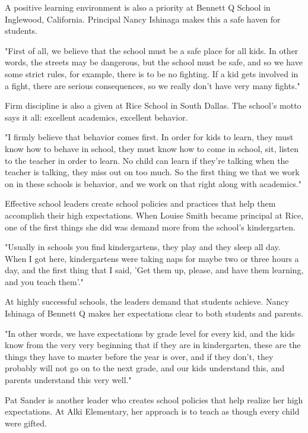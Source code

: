 A positive learning environment is also a priority at Bennett Q School in Inglewood, California. Principal Nancy Ishinaga makes this a safe haven for students.

"First of all, we believe that the school must be a safe place for all kids. In other words, the streets may be dangerous, but the school must be safe, and so we have some strict rules, for example, there is to be no fighting. If a kid gets involved in a fight, there are serious consequences, so we really don't have very many fights."

Firm discipline is also a given at Rice School in South Dallas. The school's motto says it all: excellent academics, excellent behavior.

"I firmly believe that behavior comes first. In order for kids to learn, they must know how to behave in school, they must know how to come in school, sit, listen to the teacher in order to learn. No child can learn if they're talking when the teacher is talking, they miss out on too much. So the first thing we that we work on in these schools is behavior, and we work on that right along with academics."

Effective school leaders create school policies and practices that help them accomplish their high expectations. When Louise Smith became principal at Rice, one of the first things she did was demand more from the school's kindergarten.

"Usually in schools you find kindergartens, they play and they sleep all day. When I got here, kindergartens were taking naps for maybe two or three hours a day, and the first thing that I said, 'Get them up, please, and have them learning, and you teach them'."

At highly successful schools, the leaders demand that students achieve. Nancy Ishinaga of Bennett Q makes her expectations clear to both students and parents.

"In other words, we have expectations by grade level for every kid, and the kids know from the very very beginning that if they are in kindergarten, these are the things they have to master before the year is over, and if they don't, they probably will not go on to the next grade, and our kids understand this, and parents understand this very well."

Pat Sander is another leader who creates school policies that help realize her high expectations. At Alki Elementary, her approach is to teach as though every child were gifted.

